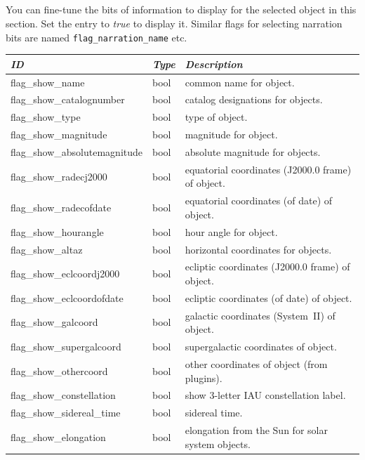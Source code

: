 \subsection{}
\label{sec:config.ini:custom_selected_info}

You can fine-tune the bits of information to display for the selected object in this section. Set the entry to \emph{true} to display it.
Similar flags for selecting narration bits are named \texttt{flag\_narration\_name} etc.

\begin{longtable}{l|l|l}\toprule
\emph{ID} & \emph{Type} & \emph{Description}\\\midrule
flag\_show\_name              & bool & common name for object.\\
flag\_show\_catalognumber     & bool & catalog designations for objects.\\
flag\_show\_type              & bool & type of object.\\
flag\_show\_magnitude         & bool & magnitude for object.\\
flag\_show\_absolutemagnitude & bool & absolute magnitude for objects.\\
flag\_show\_radecj2000        & bool & equatorial coordinates (J2000.0 frame) of object.\\
flag\_show\_radecofdate       & bool & equatorial coordinates (of date) of object.\\
flag\_show\_hourangle         & bool & hour angle for object.\\
flag\_show\_altaz             & bool & horizontal coordinates for objects.\\
flag\_show\_eclcoordj2000     & bool & ecliptic coordinates (J2000.0 frame) of object.\\
flag\_show\_eclcoordofdate    & bool & ecliptic coordinates (of date) of object.\\
flag\_show\_galcoord          & bool & galactic coordinates (System~II) of object.\\
flag\_show\_supergalcoord     & bool & supergalactic coordinates of object.\\
flag\_show\_othercoord        & bool & other coordinates of object (from plugins).\\
flag\_show\_constellation     & bool & show 3-letter IAU\index{IAU} constellation label.\\
flag\_show\_sidereal\_time    & bool & sidereal time.\\
flag\_show\_elongation        & bool & elongation from the Sun for solar system objects.\\

\end{longtable}
